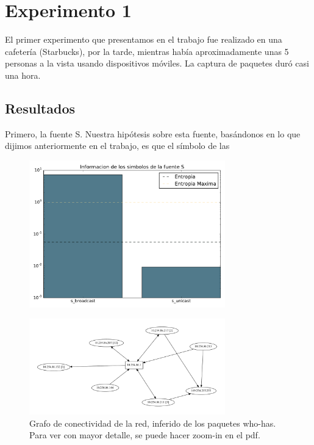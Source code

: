 \section{Experimento 1}

El primer experimento que presentamos en el trabajo fue realizado en una cafetería (Starbucks), por la tarde, mientras había aproximadamente unas 5 personas a la vista usando dispositivos móviles. La captura de paquetes duró casi una hora.

\subsection{Resultados}

Primero, la fuente S. Nuestra hipótesis sobre esta fuente, basándonos en lo que dijimos anteriormente en el trabajo, es que el símbolo de las


\begin{figure}[H]
  \centering
  \includegraphics[width=8.5cm]{exp_starbucks/grafico1.pdf}
  \caption{\normalfont }
\end{figure}

\begin{figure}[H]
  \centering
  \includegraphics[width=8.5cm]{exp_starbucks/grafico2.pdf}
  \caption{  \normalfont Grafo de conectividad de la red, inferido de los paquetes who-has. Para ver con mayor detalle, se puede hacer zoom-in en el pdf. }
\end{figure}


